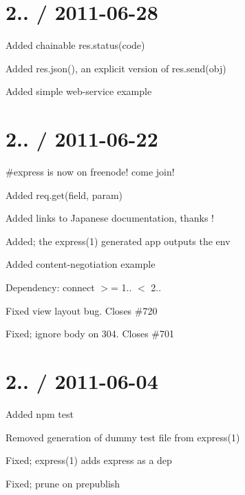 \section*{2.. / 2011-\/06-\/28 }


\begin{DoxyItemize}
\item Added chainable {\ttfamily res.\+status(code)}
\item Added {\ttfamily res.\+json()}, an explicit version of {\ttfamily res.\+send(obj)}
\item Added simple web-\/service example
\end{DoxyItemize}

\section*{2.. / 2011-\/06-\/22 }


\begin{DoxyItemize}
\item \#express is now on freenode! come join!
\item Added {\ttfamily req.\+get(field, param)}
\item Added links to Japanese documentation, thanks !
\item Added; the {\ttfamily express(1)} generated app outputs the env
\item Added {\ttfamily content-\/negotiation} example
\item Dependency\+: connect $>$= 1.. $<$ 2..
\item Fixed view layout bug. Closes \#720
\item Fixed; ignore body on 304. Closes \#701
\end{DoxyItemize}

\section*{2.. / 2011-\/06-\/04 }


\begin{DoxyItemize}
\item Added {\ttfamily npm test}
\item Removed generation of dummy test file from {\ttfamily express(1)}
\item Fixed; {\ttfamily express(1)} adds express as a dep
\item Fixed; prune on {\ttfamily prepublish}
\end{DoxyItemize}

